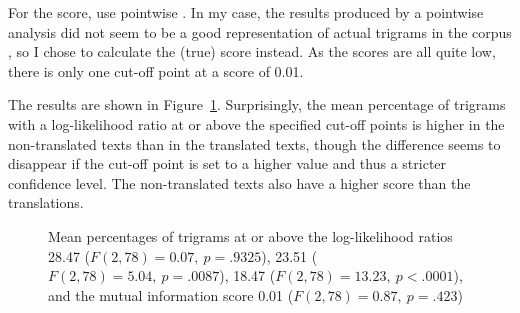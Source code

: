 \documentclass[output=paper]{LSP/langsci}
\begin{document}
For the  score, \textcite{barber03} use pointwise . In my case, the results produced by a pointwise  analysis did not seem to be a good representation of actual trigrams in the corpus \parencite[see][178--183 for a criticism of pointwise  as a measure of association]{mansch99}, so I chose to calculate the (true)  score instead. As the scores are all quite low, there is only one cut-off point at a  score of 0.01.

The results are shown in Figure~\ref{bisiada:fig:trigr-as}. Surprisingly, the mean percentage of trigrams with a log-likelihood ratio at or above the specified cut-off points is higher in the non-translated texts than in the translated texts, though the difference seems to disappear if the cut-off point is set to a higher value and thus a stricter confidence level. The non-translated texts also have a higher  score than the translations.

\begin{figure}[t]
  \caption{Mean percentages of trigrams at or above the log-likelihood ratios 28.47 ($F(2,78)=0.07,~p=.9325$), 23.51 ($F(2,78)=5.04,~p=.0087$), 18.47 ($F(2,78)=13.23,~p<.0001$), and the mutual information score 0.01 ($F(2,78)=0.87,~p=.423$)}\label{bisiada:fig:trigr-as}
\end{figure}
\end{document}

